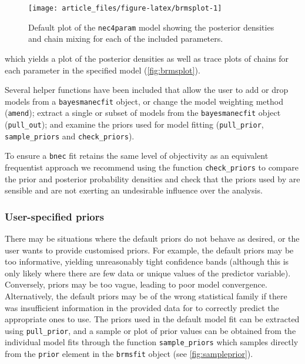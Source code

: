\begin{Schunk}
\begin{figure}[!ht]

{\centering \texttt{[image: article\_files/figure-latex/brmsplot-1]} 

}

\caption[Default  plot of the \texttt{nec4param} model showing the posterior densities and chain mixing for each of the included parameters]{Default  plot of the \texttt{nec4param} model showing the posterior densities and chain mixing for each of the included parameters.}\label{fig:brmsplot}
\end{figure}
\end{Schunk}

which yields a plot of the posterior densities as well as trace plots of
chains for each parameter in the specified model
(\autoref{fig:brmsplot}).

Several helper functions have been included that allow the user to add
or drop models from a \texttt{bayesmanecfit} object, or change the model
weighting method (\texttt{amend}); extract a single or subset of models
from the \texttt{bayesmanecfit} object (\texttt{pull\_out}); and examine
the priors used for model fitting (\texttt{pull\_prior},
\texttt{sample\_priors} and \texttt{check\_priors}).

To ensure a \texttt{bnec} fit retains the same level of objectivity as
an equivalent frequentist approach we recommend using the function
\texttt{check\_priors} to compare the prior and posterior probability
densities and check that the priors used by  are sensible
and are not exerting an undesirable influence over the analysis.

\hypertarget{user-specified-priors}{%
\subsubsection{User-specified priors}\label{user-specified-priors}}

There may be situations where the default  priors do not
behave as desired, or the user wants to provide customised priors. For
example, the default priors may be too informative, yielding
unreasonably tight confidence bands (although this is only likely where
there are few data or unique values of the predictor variable).
Conversely, priors may be too vague, leading to poor model convergence.
Alternatively, the default priors may be of the wrong statistical family
if there was insufficient information in the provided data for
 to correctly predict the appropriate ones to use. The
priors used in the default model fit can be extracted using
\texttt{pull\_prior}, and a sample or plot of prior values can be
obtained from the individual  model fits through the function
\texttt{sample\_priors} which samples directly from the \texttt{prior}
element in the \texttt{brmsfit} object (see \autoref{fig:sampleprior}).

